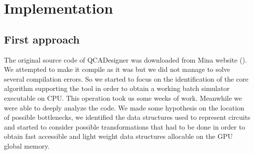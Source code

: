 \chapter{Implementation}\label{sec:implementation}
\section{First approach}
The original source code of QCADesigner was downloaded from Mina website (\cite{site:QCADesigner}). We attempted to make it compile as it was but we did not
manage to solve several compilation errors. So we started to focus on the identification of the core algorithm supporting the tool in
order to obtain a working batch simulator executable on CPU. This operation took us some weeks of work. Meanwhile we were able to deeply
analyze the code. We made some hypothesis on the location of possible bottlenecks, we identified the data structures used to represent 
circuits and started to consider possible transformations that had to be done in order to obtain fast accessible and light weight data 
structures allocable on the GPU global memory.

